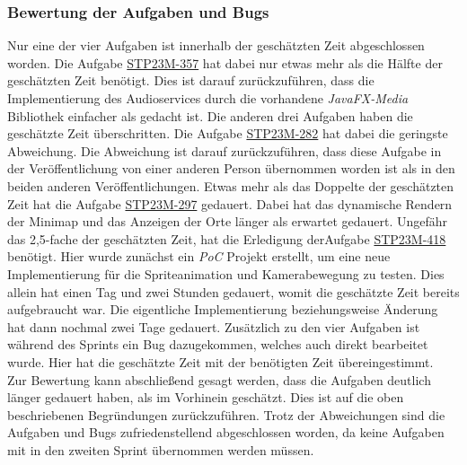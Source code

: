 \subsubsection{Bewertung der Aufgaben und Bugs}
Nur eine der vier Aufgaben ist innerhalb der geschätzten Zeit abgeschlossen worden. Die Aufgabe \hyperlink{S357}{STP23M-357} hat dabei nur etwas mehr als die Hälfte der geschätzten Zeit benötigt. Dies ist darauf zurückzuführen, dass die Implementierung des Audioservices durch die vorhandene \textit{JavaFX-Media} Bibliothek einfacher als gedacht ist. Die anderen drei Aufgaben haben die geschätzte Zeit überschritten. Die Aufgabe \hyperlink{S282}{STP23M-282} hat dabei die geringste Abweichung. Die Abweichung ist darauf zurückzuführen, dass diese Aufgabe in der Veröffentlichung von einer anderen Person übernommen worden ist als in den beiden anderen Veröffentlichungen. Etwas mehr als das Doppelte der geschätzten Zeit hat die Aufgabe \hyperlink{S297}{STP23M-297} gedauert. Dabei hat das dynamische Rendern der Minimap und das Anzeigen der Orte länger als erwartet gedauert. Ungefähr das 2,5-fache der geschätzten Zeit, hat die Erledigung derAufgabe \hyperlink{S418}{STP23M-418} benötigt. Hier wurde zunächst ein \textit{\Gls{PoC}} Projekt erstellt, um eine neue Implementierung für die Spriteanimation und Kamerabewegung zu testen. Dies allein hat einen Tag und zwei Stunden gedauert, womit die geschätzte Zeit bereits aufgebraucht war. Die eigentliche Implementierung beziehungsweise Änderung hat dann nochmal zwei Tage gedauert. Zusätzlich zu den vier Aufgaben ist während des Sprints ein Bug dazugekommen, welches auch direkt bearbeitet wurde. Hier hat die geschätzte Zeit mit der benötigten Zeit übereingestimmt.\\
Zur Bewertung kann abschließend gesagt werden, dass die Aufgaben deutlich länger gedauert haben, als im Vorhinein geschätzt. Dies ist auf die oben beschriebenen Begründungen zurückzuführen. Trotz der Abweichungen sind die Aufgaben und Bugs zufriedenstellend abgeschlossen worden, da keine Aufgaben mit in den zweiten Sprint übernommen werden müssen.